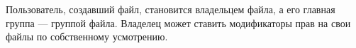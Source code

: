 Пользователь, создавший файл, становится владельцем файла, а его главная группа --- группой файла. Владелец может ставить модификаторы прав на свои файлы по собственному усмотрению.